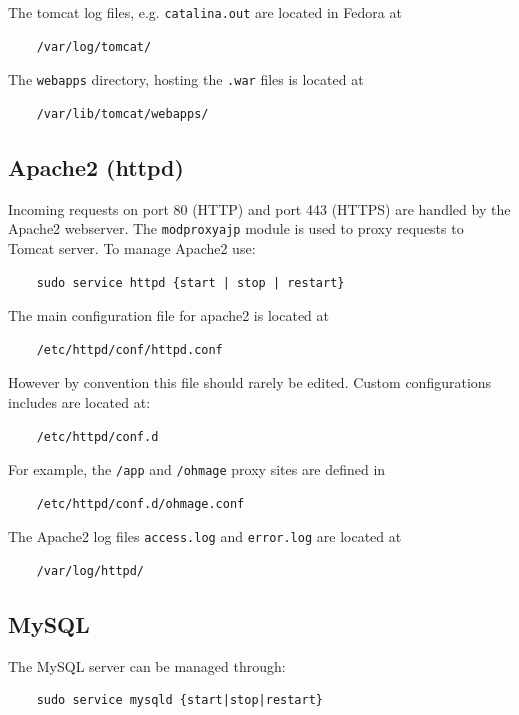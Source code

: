 \documentclass{scrartcl}
\begin{document}
The tomcat log files, e.g. \texttt{catalina.out} are located in Fedora at

\begin{verbatim}
    /var/log/tomcat/
\end{verbatim}
The \texttt{webapps} directory, hosting the \texttt{.war} files is located at

\begin{verbatim}
    /var/lib/tomcat/webapps/
\end{verbatim}

\subsection{Apache2 (httpd)}

Incoming requests on port 80 (HTTP) and port 443 (HTTPS) are handled by the
Apache2 webserver. The \texttt{mod\textunderscore proxy\textunderscore ajp}
module is used to proxy requests to Tomcat server. To manage Apache2 use:

\begin{verbatim}
    sudo service httpd {start | stop | restart}
\end{verbatim}
The main configuration file for apache2 is located at

\begin{verbatim}
    /etc/httpd/conf/httpd.conf
\end{verbatim}
However by convention this file should rarely be edited. Custom configurations
includes are located at:

\begin{verbatim}
    /etc/httpd/conf.d
\end{verbatim}
For example, the \texttt{/app} and \texttt{/ohmage} proxy sites are defined in
\begin{verbatim}
    /etc/httpd/conf.d/ohmage.conf
\end{verbatim}
The Apache2 log files \texttt{access.log} and \texttt{error.log} are located at

\begin{verbatim}
    /var/log/httpd/
\end{verbatim}

\subsection{MySQL}

The MySQL server can be managed through:

\begin{verbatim}
    sudo service mysqld {start|stop|restart}
\end{verbatim}
\end{document}
